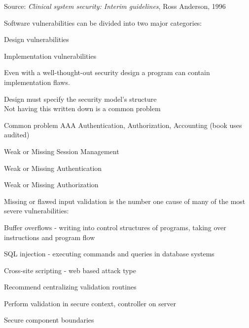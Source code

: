 \documentclass[Screen16to9,17pt]{foils}
\begin{document}



Source:
\emph{Clinical system security: Interim guidelines}, Ross Anderson, 1996



Software vulnerabilities can be divided into two major categories:
\begin{list2}
\item Design vulnerabilities
\item Implementation vulnerabilities
\end{list2}

Even with a well-thought-out security design a program can contain implementation flaws.


\begin{list2}
\item Design must specify the security model's structure\\
Not having this written down is a common problem
\item Common problem AAA Authentication, Authorization, Accounting (book uses audited)
\item Weak or Missing Session Management
\item Weak or Missing Authentication
\item Weak or Missing Authorization
\end{list2}



Missing or flawed input validation is the number one cause of many of the most severe vulnerabilities:
\begin{list2}
\item Buffer overflows - writing into control structures of programs, taking over instructions and program flow
\item SQL injection - executing commands and queries in database systems
\item Cross-site scripting - web based attack type
\item Recommend centralizing validation routines
\item Perform validation in secure context, controller on server
\item Secure component boundaries
\end{list2}

\end{document}
